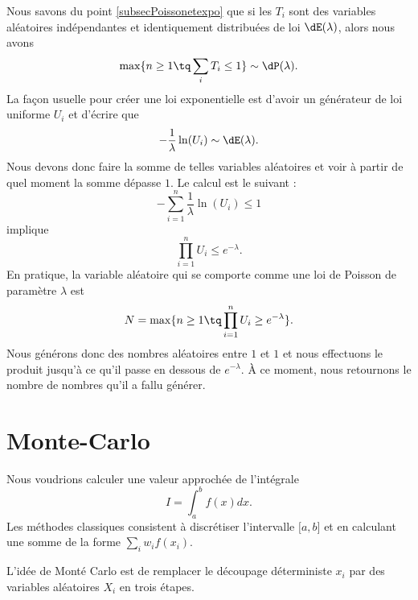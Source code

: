 Nous savons du point \ref{subsecPoissonetexpo} que si les \( T_i\) sont des variables aléatoires indépendantes et identiquement distribuées de loi \( \dE(\lambda)\), alors nous avons
\begin{equation}
    \max\{ n\geq 1\tq\sum_iT_i\leq 1 \}\sim\dP(\lambda).
\end{equation}
La façon usuelle pour créer une loi exponentielle est d'avoir un générateur de loi uniforme \( U_i\) et d'écrire que
\begin{equation}
    -\frac{1}{ \lambda }\ln(U_i)\sim \dE(\lambda).
\end{equation}
Nous devons donc faire la somme de telles variables aléatoires et voir à partir de quel moment la somme dépasse \( 1\). Le calcul est le suivant :
\begin{equation}
    -\sum_{i=1}^{n}\frac{1}{ \lambda }\ln(U_i)\leq 1
\end{equation}
implique
\begin{equation}
    \prod_{i=1}^nU_i\leq  e^{-\lambda}.
\end{equation}
En pratique, la variable aléatoire qui se comporte comme une loi de Poisson de paramètre \( \lambda\) est
\begin{equation}
    N=\max\{ n\geq 1\tq \prod_{i=1}^nU_i\geq e^{-\lambda} \}.
\end{equation}
Nous générons donc des nombres aléatoires entre \( 1\) et \( 1\) et nous effectuons le produit jusqu'à ce qu'il passe en dessous de \(  e^{-\lambda}\). À ce moment, nous retournons le nombre de nombres qu'il a fallu générer.


\section{Monte-Carlo}

Nous voudrions calculer une valeur approchée de l'intégrale
\begin{equation}
    I=\int_a^bf(x)dx.
\end{equation}
Les méthodes classiques consistent à discrétiser l'intervalle \( \mathopen[ a , b \mathclose]\) et en calculant une somme de la forme \( \sum_iw_if(x_i)\).

L'idée de Monté Carlo est de remplacer le découpage déterministe \( x_i\) par des variables aléatoires \( X_i\) en trois étapes. 

